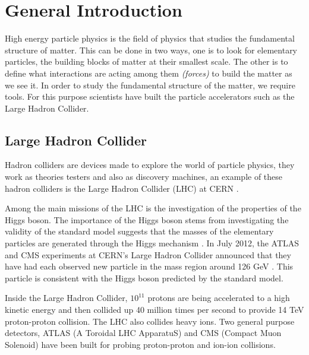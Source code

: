 \chapter{General Introduction}
High energy particle physics is the field of physics that studies the fundamental structure of matter. This can be done in two ways, one is to look for elementary particles, the building blocks of matter at their smallest scale. The other is to define what interactions are acting among them
\emph{(forces)} to build the matter as we see it. In order to study the fundamental structure of the matter, we require tools. For this purpose scientists have built the particle accelerators such as the Large Hadron Collider.



\section{Large Hadron Collider}

Hadron colliders are devices made to explore the world of particle physics, they work as theories testers and also as  discovery machines, an example of these hadron colliders is the Large Hadron Collider (LHC) at CERN \citep{1748-0221-3-08-S08001}.

Among the main missions of the LHC is the investigation of the properties of the Higgs boson. The importance of the Higgs boson stems from investigating the validity of the standard model suggests that the masses of the elementary particles are generated through the Higgs mechanism \citep{particle}. In July 2012, the ATLAS and CMS experiments at CERN's Large Hadron Collider announced that they have had each observed new particle in the mass region around 126 GeV \citep{Aad:2012tfa}. This particle is consistent with the Higgs boson predicted by the standard model.  

Inside the Large Hadron Collider, $10^{11}$ protons are being accelerated to a high kinetic energy and then collided up 40 million times per second to provide 14 \si{TeV} proton-proton collision. The LHC also collides heavy ions. Two general purpose detectors, ATLAS (A Toroidal LHC ApparatuS) \cite{Aad:2008zzm} and CMS (Compact Muon Solenoid) \cite{1748-0221-3-08-S08004} have been built for probing proton-proton and ion-ion collisions.
 
